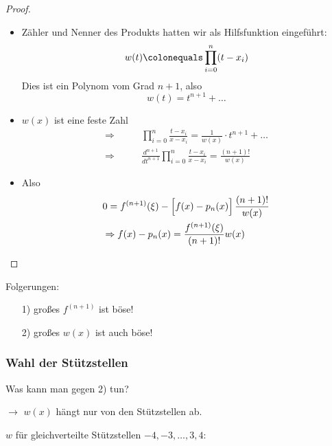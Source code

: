 \begin{proof}
\begin{itemize}
\item Zähler und Nenner des Produkts hatten wir als Hilfsfunktion eingeführt:
 \begin{equation*}
  w(t) \colonequals \prod_{i=0}^n (t-x_i)
 \end{equation*}
 Dies ist ein Polynom vom Grad $n+1$, also
\begin{equation*}
 w(t) = t^{n+1} + \hdots
\end{equation*}
\item $w(x)$ ist eine feste Zahl
\begin{align*}
 \Rightarrow & \qquad \prod_{i=0}^n \frac{t-x_i}{x-x_i} = \frac{1}{w(x)}\cdot t^{n+1} + \hdots \\
 \Rightarrow & \qquad \frac{d^{n+1}}{dt^{n+1}} \prod_{i=0}^n \frac{t-x_i}{x-x_i} = \frac{(n+1)!}{w(x)}
\end{align*}
\item Also 
\begin{align*}
 &0 = f^{(n+1)}(\xi) - \Big[f(x) - p_n(x) \Big] \, \frac{(n+1)!}{w(x)} \\
 &\Rightarrow f(x) - p_n(x) =  \frac{f^{(n+1)}(\xi)}{(n+1)!} w(x)
 \qedhere
\end{align*}
\end{itemize}
\end{proof}


Folgerungen:
\begin{itemize}
\item[1)] großes $f^{(n+1)}$ ist böse!
\item[2)] großes $w(x)$ ist auch böse!
\end{itemize}

\subsubsection{Wahl der Stützstellen}

Was kann man gegen 2) tun?

\medskip

$\rightarrow$ $w(x)$ hängt nur von den Stützstellen ab.
\begin{center}
 $w$ für gleichverteilte Stützstellen $-4, -3, \dots, 3, 4$:
\end{center}

\begin{center}
\end{center}

